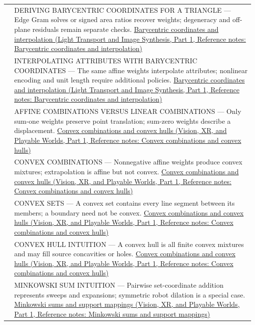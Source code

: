 {\begin{longtable}[]{@{}
  >{\raggedright\arraybackslash}p{}
  >{\raggedright\arraybackslash}p{}@{}}
569 & DERIVING BARYCENTRIC COORDINATES FOR A TRIANGLE --- Edge Gram solves or signed area ratios recover weights; degeneracy and off-plane residuals remain separate checks. \href{../04-Light-Transport-and-Image-Synthesis-P01/main.pdf\#appendix-02b9d9a81dca}{Barycentric coordinates and interpolation (Light Transport and Image Synthesis, Part 1, Reference notes: Barycentric coordinates and interpolation)} \\
570 & INTERPOLATING ATTRIBUTES WITH BARYCENTRIC COORDINATES --- The same affine weights interpolate attributes; nonlinear encoding and unit length require additional policies. \href{../04-Light-Transport-and-Image-Synthesis-P01/main.pdf\#appendix-02b9d9a81dca}{Barycentric coordinates and interpolation (Light Transport and Image Synthesis, Part 1, Reference notes: Barycentric coordinates and interpolation)} \\
571 & AFFINE COMBINATIONS VERSUS LINEAR COMBINATIONS --- Only sum-one weights preserve point translation; sum-zero weights describe a displacement. \href{../07-Vision-XR-and-Playable-Worlds-P01/main.pdf\#appendix-0026ec42c9d5}{Convex combinations and convex hulls (Vision, XR, and Playable Worlds, Part 1, Reference notes: Convex combinations and convex hulls)} \\
572 & CONVEX COMBINATIONS --- Nonnegative affine weights produce convex mixtures; extrapolation is affine but not convex. \href{../07-Vision-XR-and-Playable-Worlds-P01/main.pdf\#appendix-0026ec42c9d5}{Convex combinations and convex hulls (Vision, XR, and Playable Worlds, Part 1, Reference notes: Convex combinations and convex hulls)} \\
573 & CONVEX SETS --- A convex set contains every line segment between its members; a boundary need not be convex. \href{../07-Vision-XR-and-Playable-Worlds-P01/main.pdf\#appendix-0026ec42c9d5}{Convex combinations and convex hulls (Vision, XR, and Playable Worlds, Part 1, Reference notes: Convex combinations and convex hulls)} \\
574 & CONVEX HULL INTUITION --- A convex hull is all finite convex mixtures and may fill source concavities or holes. \href{../07-Vision-XR-and-Playable-Worlds-P01/main.pdf\#appendix-0026ec42c9d5}{Convex combinations and convex hulls (Vision, XR, and Playable Worlds, Part 1, Reference notes: Convex combinations and convex hulls)} \\
575 & MINKOWSKI SUM INTUITION --- Pairwise set-coordinate addition represents sweeps and expansions; symmetric robot dilation is a special case. \href{../07-Vision-XR-and-Playable-Worlds-P01/main.pdf\#appendix-215ac7099a82}{Minkowski sums and support mappings (Vision, XR, and Playable Worlds, Part 1, Reference notes: Minkowski sums and support mappings)} \\

\end{longtable}}
